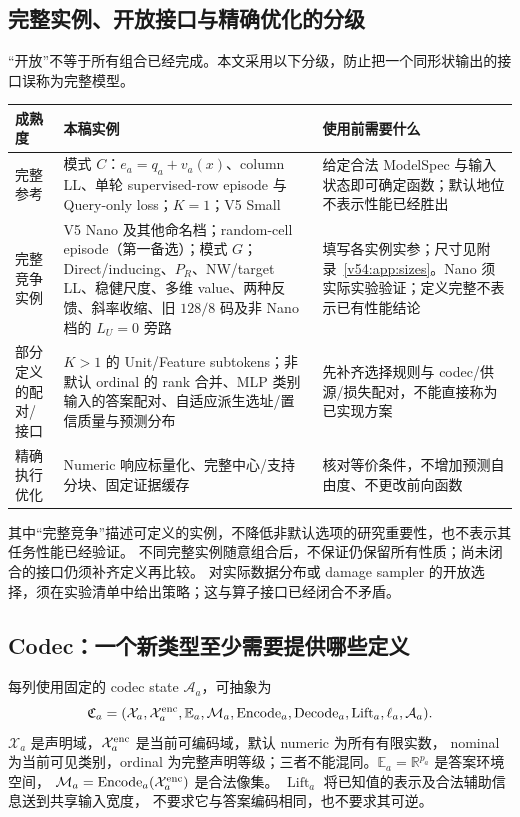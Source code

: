 \documentclass[11pt,UTF8,fontset=fandol]{ctexart}
\numberwithin{equation}{section}
\theoremstyle{definition}
\begin{document}
\subsection{完整实例、开放接口与精确优化的分级}
\label{v53:sec:maturity}
“开放”不等于所有组合已经完成。本文采用以下分级，防止把一个同形状输出的接口误称为完整模型。
\begin{center}\small
\begin{tabularx}{\linewidth}{>{\raggedright\arraybackslash}p{28mm}>{\raggedright\arraybackslash}X>{\raggedright\arraybackslash}X}
\toprule
成熟度 & 本稿实例 & 使用前需要什么\\\midrule
完整参考 & 模式 $C$：$e_a=q_a+v_a(x)$、column LL、单轮 supervised-row episode 与 Query-only loss；$K=1$；V5 Small & 给定合法 ModelSpec 与输入状态即可确定函数；默认地位不表示性能已经胜出\\
完整竞争实例 & V5 Nano 及其他命名档；random-cell episode（第一备选）；模式 $G$；Direct/inducing、$P_R$、NW/target LL、稳健尺度、多维 value、两种反馈、斜率收缩、旧 $128/8$ 码及非 Nano 档的 $L_U=0$ 旁路 & 填写各实例实参；尺寸见附录~\ref{v54:app:sizes}。Nano 须实际实验验证；定义完整不表示已有性能结论\\
部分定义的配对/接口 & $K>1$ 的 Unit/Feature subtokens；非默认 ordinal 的 rank 合并、MLP 类别输入的答案配对、自适应派生选址/置信质量与预测分布 & 先补齐选择规则与 codec/供源/损失配对，不能直接称为已实现方案\\
精确执行优化 & Numeric 响应标量化、完整中心/支持分块、固定证据缓存 & 核对等价条件，不增加预测自由度、不更改前向函数\\\bottomrule
\end{tabularx}
\end{center}
其中“完整竞争”描述可定义的实例，不降低非默认选项的研究重要性，也不表示其任务性能已经验证。
不同完整实例随意组合后，不保证仍保留所有性质；尚未闭合的接口仍须补齐定义再比较。
对实际数据分布或 damage sampler 的开放选择，须在实验清单中给出策略；这与算子接口已经闭合不矛盾。


\subsection{Codec：一个新类型至少需要提供哪些定义}
每列使用固定的 codec state $\mathcal A_a$，可抽象为
\begin{equation}
 \mathfrak C_a=
 (\mathcal X_a,\mathcal X_a^{\rm enc},\mathbb E_a,\mathcal M_a,
  \operatorname{Encode}_a,\operatorname{Decode}_a,\operatorname{Lift}_a,
  \ell_a,\mathcal A_a).
 \label{v52:eq:codec-interface}
\end{equation}
$\mathcal X_a$ 是声明域，$\mathcal X_a^{\rm enc}$ 是当前可编码域，默认 numeric 为所有有限实数，
nominal 为当前可见类别，ordinal 为完整声明等级；三者不能混同。$\mathbb E_a=\mathbb R^{p_a}$ 是答案环境空间，
$\mathcal M_a=\operatorname{Encode}_a(\mathcal X_a^{\rm enc})$ 是合法像集。
$\operatorname{Lift}_a$ 将已知值的表示及合法辅助信息送到共享输入宽度，
不要求它与答案编码相同，也不要求其可逆。
\end{document}
